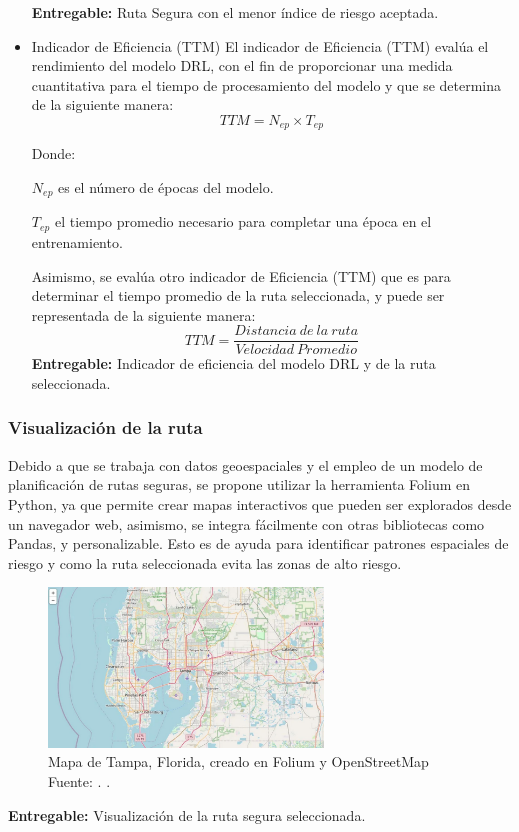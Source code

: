 \begin{itemize}
\textbf{Entregable:} Ruta Segura con el menor índice de riesgo aceptada.
	\item Indicador de Eficiencia (TTM)
El indicador de Eficiencia (TTM) evalúa el rendimiento del modelo DRL, con el fin de proporcionar una medida cuantitativa para el tiempo de procesamiento del modelo y que se determina de la siguiente manera:
\begin{equation} 
	TTM = N_{ep} \times T_{ep}
\end{equation}

Donde: 

$N_{ep}$ es el número de épocas del modelo.

$T_{ep}$ el tiempo promedio necesario para completar una época en el entrenamiento.

Asimismo, se evalúa otro indicador de Eficiencia (TTM) que es para determinar el tiempo promedio de la ruta seleccionada, y puede ser representada de la siguiente manera:
\begin{equation} 
	TTM = \frac{Distancia \:de \:la\: ruta}{Velocidad \: Promedio}
\end{equation}
\textbf{Entregable:} Indicador de eficiencia del modelo DRL y de la ruta seleccionada.
\end{itemize}
\subsubsection{Visualización de la ruta}
Debido a que se trabaja con datos geoespaciales y el empleo de un modelo de planificación de rutas seguras, se propone utilizar la herramienta Folium en Python, ya que permite crear mapas interactivos que pueden ser explorados desde un navegador web, asimismo, se integra fácilmente con otras bibliotecas como Pandas, y personalizable. Esto es de ayuda para identificar patrones espaciales de riesgo y como la ruta seleccionada evita las zonas de alto riesgo.
	\begin{figure}[h]
	\begin{center}
		\includegraphics[width=0.65\textwidth]{3/figures/florida.jpg}
		\caption[Mapa de Tampa, Florida, creado en Folium y OpenStreetMap]{Mapa de Tampa, Florida, creado en Folium y OpenStreetMap\\
			Fuente: \citep*{gl_folium}. .}
		\label{1:fig}
	\end{center}
\end{figure}
\textbf{Entregable:} Visualización de la ruta segura seleccionada.

